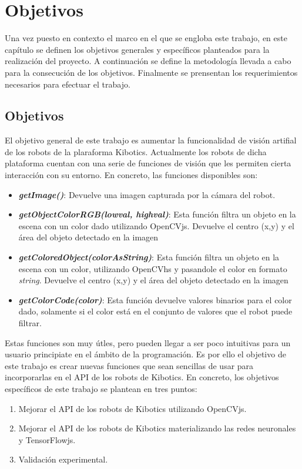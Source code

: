 \documentclass{report}
\begin{document}
\chapter{Objetivos}
Una vez puesto en contexto el marco en el que se engloba este trabajo, en este capítulo se definen los objetivos generales y específicos planteados para la realización del proyecto. A continuación se define la metodología llevada a cabo para la consecución de los objetivos. Finalmente se prensentan los requerimientos necesarios para efectuar el trabajo.

\section{Objetivos}
El objetivo general de este trabajo es aumentar la funcionalidad de visión artifial de los robots de la plaraforma Kibotics. Actualmente los robots de dicha plataforma cuentan con una serie de funciones de visión que les permiten cierta interacción con su entorno. En concreto, las funciones disponibles son:

\begin{itemize}
\item \textit{\textbf{getImage()}}: Devuelve una imagen capturada por la cámara del robot.
\item \textit{\textbf{getObjectColorRGB(lowval, highval)}}: Esta función filtra un objeto en la escena con un color dado utilizando OpenCVjs. Devuelve el centro (x,y) y el área del objeto detectado en la imagen
\item \textit{\textbf{getColoredObject(colorAsString)}}: Esta función filtra un objeto en la escena con un color, utilizando OpenCVhs y pasandole el color en formato \textit{string}. Devuelve el centro (x,y) y el área del objeto detectado en la imagen
\item \textit{\textbf{getColorCode(color)}}: Esta función devuelve valores binarios para el color dado, solamente si el color está en el conjunto de valores que el robot puede filtrar.
\end{itemize}

Estas funciones son muy útles, pero pueden llegar a ser poco intuitivas para un usuario principiate en el ámbito de la programación. Es por ello el objetivo de este trabajo es crear nuevas funciones que sean sencillas de usar para incorporarlas en el API de los robots de Kibotics. En concreto, los objetivos específicos de este trabajo se plantean en tres puntos:

\newpage
\begin{enumerate}
\item Mejorar el API de los robots de Kibotics utilizando OpenCVjs.
\item Mejorar el API de los robots de Kibotics materializando las redes neuronales y TensorFlowjs.
\item Validación experimental.
\end{enumerate}
\end{document}
